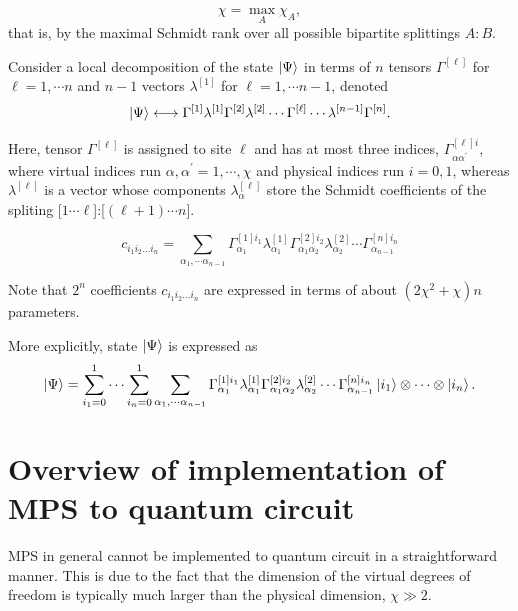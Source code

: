 \documentclass[11pt, oneside]{article}   	%
\begin{document}
\begin{equation}
\chi = \max_A \chi_A,
\end{equation}
that is, by the maximal Schmidt rank over all possible bipartite splittings $A:B$.

Consider a local decomposition of the state $\ket{\Psi}$ in terms of $n$ tensors 
$\Gamma^{[\ell]}$ for $\ell = 1, \cdots n$ 
and $n-1$ vectors 
$\lambda^{[1]}$ for $\ell = 1, \cdots n-1$, denoted
\begin{equation}
\ket{\Psi} \longleftrightarrow \Gamma^{[1]} \lambda^{[1]} \Gamma^{[2]} \lambda^{[2]} \cdots \Gamma^{[\ell]} \cdots \lambda^{[n-1]} \Gamma^{[n]}.
\end{equation}

Here, tensor $\Gamma^{[\ell]}$ is assigned to site $\ell$ and has at most three indices, $\Gamma^{[\ell] i}_{\alpha \alpha^{\prime}}$, 
where virtual indices run $\alpha, \alpha^{\prime} = 1, \cdots , \chi$ and physical indices run $i = 0, 1$, 
whereas $\lambda^{[\ell]}$ is a vector whose components $\lambda^{[\ell]}_{\alpha}$ store the Schmidt coefficients of the spliting [$1 \cdots \ell$]:[$(\ell+1) \cdots n$].

\begin{equation}
c_{i_1 i_2 \dots i_n} 
= \sum_{\alpha_1, \cdots \alpha_{n-1}} \Gamma^{[1] i_1}_{\alpha_1} \lambda^{[1]}_{\alpha_1} \Gamma^{[2] i_2}_{\alpha_1 \alpha_2} \lambda^{[2]}_{\alpha_2} \cdots \Gamma^{[n] i_n}_{\alpha_{n-1}}
\end{equation}

Note that $2^n$ coefficients $c_{i_1 i_2 \dots i_n}$ are expressed in terms of about $(2 \chi^2 + \chi) n$ parameters.

More explicitly, state $\ket{\Psi}$ is expressed as
\begin{equation}
\ket{\Psi} 
= \sum^1_{i_1 = 0} \cdots \sum^1_{i_n = 0} 
\sum_{\alpha_1, \cdots \alpha_{n-1}} \Gamma^{[1] i_1}_{\alpha_1} \lambda^{[1]}_{\alpha_1} \Gamma^{[2] i_2}_{\alpha_1 \alpha_2} \lambda^{[2]}_{\alpha_2} \cdots \Gamma^{[n] i_n}_{\alpha_{n-1}}
\ket{i_1} \otimes \cdots \otimes \ket{i_n}.
\end{equation}

\section{Overview of implementation of MPS to quantum circuit}
MPS in general cannot be implemented to quantum circuit in a straightforward manner.
This is due to the fact that the dimension of the virtual degrees of freedom is typically much larger than the physical dimension, $\chi \gg 2$.
\end{document}
